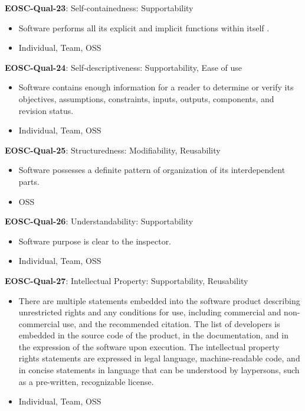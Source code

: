 \textbf{EOSC-Qual-23}: Self-containedness: Supportability

\begin{itemize}
    \item Software performs all its explicit and implicit functions within itself . \cite{boehm_quantitative_1976}
    \item Individual, Team, OSS
\end{itemize}

\textbf{EOSC-Qual-24}: Self-descriptiveness: Supportability, Ease of use

\begin{itemize}
    \item Software contains enough information for a reader to determine or verify its objectives, assumptions, constraints, inputs, outputs, components, and revision status. \cite{boehm_quantitative_1976}
    \item Individual, Team, OSS
\end{itemize}

\textbf{EOSC-Qual-25}: Structuredness: Modifiability, Reusability

\begin{itemize}
    \item Software possesses a definite pattern of organization of its interdependent parts. \cite{boehm_quantitative_1976}
    \item OSS
\end{itemize}

\textbf{EOSC-Qual-26}: Understandability: Supportability

\begin{itemize}
    \item Software purpose is clear to the inspector. \cite{boehm_quantitative_1976}
    \item Individual, Team, OSS
\end{itemize}

\textbf{EOSC-Qual-27}: Intellectual Property: Supportability, Reusability

\begin{itemize}
    \item There are multiple statements embedded into the software product describing unrestricted rights and any conditions for use, including commercial and non-commercial use, and the recommended citation. The list of developers is embedded in the source code of the product, in the documentation, and in the expression of the software upon execution. The intellectual property rights statements are expressed in legal language, machine-readable code, and in concise statements in language that can be understood by laypersons, such as a pre-written, recognizable license. \cite{shepherdson_cessda_2019}
    \item Individual, Team, OSS
\end{itemize}

